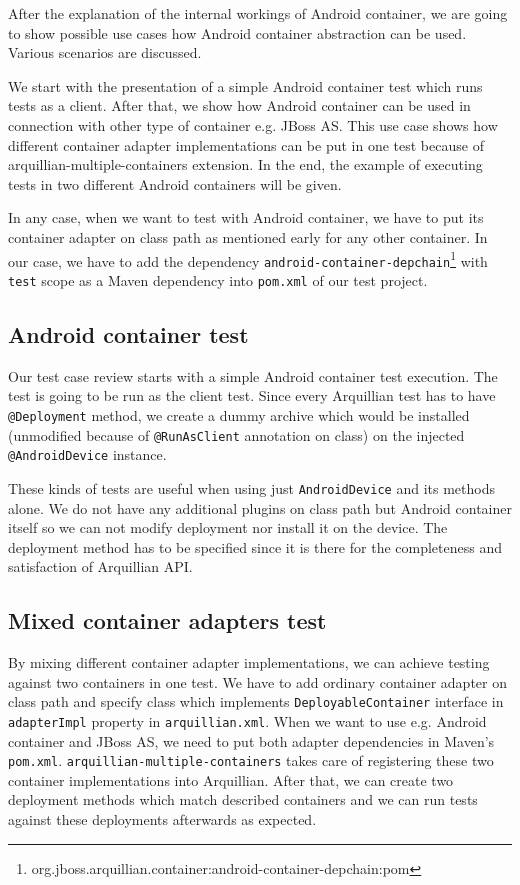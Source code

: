 \documentclass[12pt,final,oneside]{fithesis}
\begin{document}
After the explanation of the internal workings of Android container, we are going to show possible use cases how Android container abstraction can be used. Various scenarios are discussed.

We start with the presentation of a simple Android container test which runs tests as a client. After that, we show how Android container can be used in connection with other type of container e.g. JBoss AS. This use case shows how different container adapter implementations can be put in one test because of arquillian-multiple-containers extension. In the end, the example of executing tests in two different Android containers will be given.

In any case, when we want to test with Android container, we have to put its container adapter on class path as mentioned early for any other container. In our case, we have to add the dependency \texttt{android-container-depchain}\footnote{org.jboss.arquillian.container:android-container-depchain:pom} with \texttt{test} scope as a Maven dependency into \texttt{pom.xml} of our test project.

		\subsection{Android container test}

Our test case review starts with a simple Android container test execution. The test is going to be run as the client test. Since every Arquillian test has to have \texttt{@Deployment} method, we create a dummy archive which would be installed (unmodified because of \texttt{@RunAsClient} annotation on class) on the injected \texttt{@AndroidDevice} instance.

These kinds of tests are useful when using just \texttt{AndroidDevice} and its methods alone. We do not have any additional plugins on class path but Android container itself so we can not modify deployment nor install it on the device. The deployment method has to be specified since it is there for the completeness and satisfaction of Arquillian API.



		\subsection{Mixed container adapters test}

By mixing different container adapter implementations, we can achieve testing against two containers in one test. We have to add ordinary container adapter on class path and specify class which implements \texttt{DeployableContainer} interface in \texttt{adapterImpl} property in \linebreak \texttt{arquillian.xml}. When we want to use e.g. Android container and JBoss AS, we need to put both adapter dependencies in Maven's \texttt{pom.xml}. \texttt{arquillian\--multiple-containers} takes care of registering these two container implementations into Arquillian. After that, we can create two deployment methods which match described containers and we can run tests against these deployments afterwards as expected.
\end{document}
